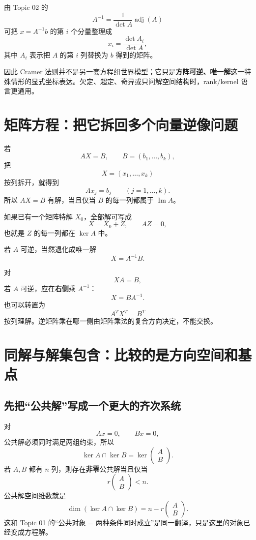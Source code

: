 \documentclass[11pt,a4paper]{ctexart}
\newcommand{\kw}[1]{\textbf{\color{deep}#1}}
\begin{document}
由 Topic 02 的
\[
A^{-1}=\frac{1}{\det A}\operatorname{adj}(A)
\]
可把 $x=A^{-1}b$ 的第 $i$ 个分量整理成
\[
\boxed{x_i=\frac{\det A_i}{\det A},}
\]
其中 $A_i$ 表示把 $A$ 的第 $i$ 列替换为 $b$ 得到的矩阵。

因此 Cramer 法则并不是另一套方程组世界模型；它只是\kw{方阵可逆、唯一解}这一特殊情形的显式坐标表达。欠定、超定、奇异或只问解空间结构时，rank/kernel 语言更通用。

\section{矩阵方程：把它拆回多个向量逆像问题}

若
\[
AX=B,
\qquad
B=(b_1,\dots,b_k),
\]
把
\[
X=(x_1,\dots,x_k)
\]
按列拆开，就得到
\[
Ax_j=b_j
\qquad(j=1,\dots,k).
\]
所以 $AX=B$ 有解，当且仅当 $B$ 的每一列都属于 $\operatorname{Im}A$。

如果已有一个矩阵特解 $X_0$，全部解可写成
\[
X=X_0+Z,
\qquad AZ=0,
\]
也就是 $Z$ 的每一列都在 $\ker A$ 中。

若 $A$ 可逆，当然退化成唯一解
\[
X=A^{-1}B.
\]

对
\[
XA=B,
\]
若 $A$ 可逆，应在\kw{右侧}乘 $A^{-1}$：
\[
X=BA^{-1}.
\]
也可以转置为
\[
A^TX^T=B^T
\]
按列理解。逆矩阵乘在哪一侧由矩阵乘法的复合方向决定，不能交换。

\section{同解与解集包含：比较的是方向空间和基点}

\subsection{先把“公共解”写成一个更大的齐次系统}

对
\[
Ax=0,
\qquad
Bx=0,
\]
公共解必须同时满足两组约束，所以
\[
\boxed{
\ker A\cap\ker B
=
\ker\begin{pmatrix}A\\B\end{pmatrix}.
}
\]
若 $A,B$ 都有 $n$ 列，则存在\kw{非零}公共解当且仅当
\[
\boxed{
r\begin{pmatrix}A\\B\end{pmatrix}<n.}
\]
公共解空间维数就是
\[
\boxed{
\dim(\ker A\cap\ker B)
=n-r\begin{pmatrix}A\\B\end{pmatrix}.
}
\]
这和 Topic 01 的“公共对象 = 两种条件同时成立”是同一翻译，只是这里的对象已经变成方程解。
\end{document}
